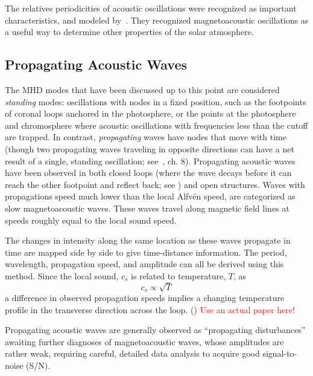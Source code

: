 \documentclass[preprint2]{aastex}
\begin{document}
The relatives periodicities of acoustic oscillations were recognized
as important characteristics, and modeled by~\cite{acoustic_1}.
They recognized magnetoacoustic oscillations as a useful way to determine
other properties of the solar atmosphere.
\subsection{Propagating Acoustic Waves}
The MHD modes that have been discussed up to this point are considered
\emph{standing} modes: oscillations with nodes in a fixed
position, such as the footpoints of coronal loops anchored in
the photosphere, or the points at the photosphere and chromosphere where
acoustic oscillations with frequencies less than the cutoff are trapped.
In contrast, \emph{propagating} waves have nodes that move with time
(though two propagating waves traveling in opposite directions can
have a net result of a single, standing oscillation; see~\cite{Asc},
ch. 8).
Propagating acoustic waves have been observed in both closed loops
(where the wave decays before it can reach the other footpoint
and reflect back; see {\cite{acoustic_1}})
and open structures.
Waves with propagations speed much lower than the
local Alfv\'en speed, are categorized as slow magnetoacoustic waves.
These waves travel along magnetic field lines at speeds roughly equal to
the local sound speed.

The changes in intensity along the same location as these waves
propagate in time are mapped side by side to give time-distance
information. The period, wavelength, propagation speed, and amplitude
can all be derived using this method.
Since the local sound, $c_{s}$ is related to temperature, $T$, as
\begin{equation}\label{sound-temp}
 c_{s} \propto \sqrt{T}
\end{equation}
a difference in observed propagation speeds implies a changing
temperature profile in the transverse direction across the loop.
(\cite{Nak}) \textcolor{red}{Use an actual paper here!}

Propagating acoustic waves are generally observed as ``propagating
disturbances'' awaiting further diagnoses of magnetoacoustic waves,
whose amplitudes are rather weak, requiring careful, detailed data
analysis to acquire good signal-to-noise (S/N).
\end{document}
